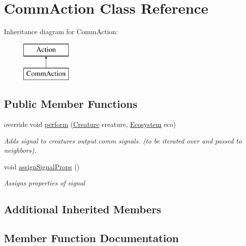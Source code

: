 \hypertarget{class_comm_action}{}\section{Comm\+Action Class Reference}
\label{class_comm_action}
Inheritance diagram for Comm\+Action\+:\begin{figure}[H]
\begin{center}
\leavevmode
\includegraphics[height=2.000000cm]{class_comm_action}
\end{center}
\end{figure}
\subsection*{Public Member Functions}
\begin{DoxyCompactItemize}
\item 
override void \mbox{\hyperlink{class_comm_action_a4ea8e9bcc0a5060221efdc6afefa4355}{perform}} (\mbox{\hyperlink{class_creature}{Creature}} creature, \mbox{\hyperlink{class_ecosystem}{Ecosystem}} eco)
\begin{DoxyCompactList}\small\item\em Adds signal to creatures output comm signals. (to be iterated over and passed to neighbors). \end{DoxyCompactList}\item 
void \mbox{\hyperlink{class_comm_action_ab1c591777d0b6c2e567f69e7dd15e2c1}{assign\+Signal\+Props}} ()
\begin{DoxyCompactList}\small\item\em Assigns properties of signal \end{DoxyCompactList}\end{DoxyCompactItemize}
\subsection*{Additional Inherited Members}


\subsection{Member Function Documentation}
\mbox{\label{class_comm_action_ab1c591777d0b6c2e567f69e7dd15e2c1}} 

